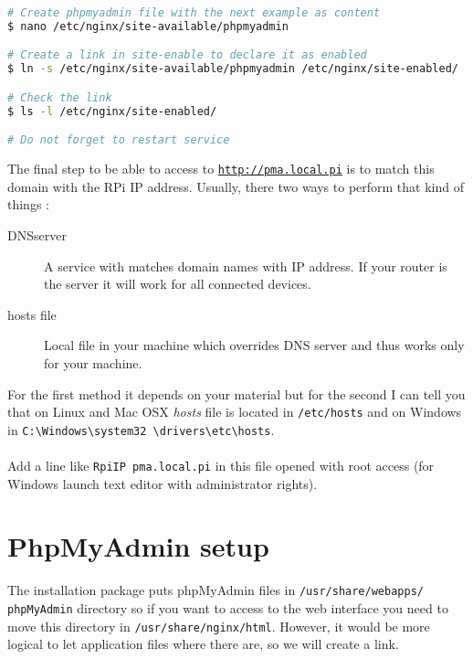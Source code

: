 \begin{lstlisting}[language=bash,caption=Create a subdomain]
# Create phpmyadmin file with the next example as content
$ nano /etc/nginx/site-available/phpmyadmin

# Create a link in site-enable to declare it as enabled
$ ln -s /etc/nginx/site-available/phpmyadmin /etc/nginx/site-enabled/

# Check the link
$ ls -l /etc/nginx/site-enabled/

# Do not forget to restart service
\end{lstlisting} 

\lstset{language=bash,caption=PhpMyAdmin domain example}


\label{theme:dns}
The final step to be able to access to \href{http://pma.local.pi}
{\texttt{http://pma.local.pi}} is to match this domain with the RPi IP address. 
Usually, there two ways to perform that kind of things :
\begin{description}
	\item[DNS\footnotemark server] 
					  A service with matches 
					  domain names with IP address. If your router is the server 
					  it will work for all connected devices.
					  
	\item[hosts file] Local file in your machine which overrides DNS server and 
					 thus works only for your machine.\\
\end{description}

For the first method it depends on your material but for the second I can tell you 
that on Linux and Mac OSX \emph{hosts} file is located in \texttt{/etc/hosts} and 
on Windows in \texttt{C:\textbackslash{}Windows\textbackslash{}system32
\textbackslash{}drivers\textbackslash{}etc\textbackslash{}hosts}. 
\\\\
Add a line like \og{}\texttt{RpiIP pma.local.pi}\fg{} in this file opened with 
root access (for Windows launch text editor with administrator rights).

\section{PhpMyAdmin setup}\label{section:PhpMyAdmin}
The installation package puts phpMyAdmin files in \texttt{/usr/share/webapps/
phpMyAdmin} directory so if you want to access to the web interface you need to 
move this directory in \texttt{/usr/share/nginx/html}. However, it would be more 
logical to let application files where there are, so we will create a link.

